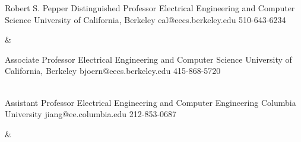 
\begin{cvreferences}
  {Robert S. Pepper Distinguished Professor}
  {Electrical Engineering and Computer Science}
  {University of California, Berkeley}
  {eal@eecs.berkeley.edu}
  {510-643-6234}

  &

  {Associate Professor}
  {Electrical Engineering and Computer Science}
  {University of California, Berkeley}
  {bjoern@eecs.berkeley.edu}
  {415-868-5720}

  \\

  {Assistant Professor}
  {Electrical Engineering and Computer Engineering}
  {Columbia University}
  {jiang@ee.columbia.edu}
  {212-853-0687}

  &






  \\
\end{cvreferences}

